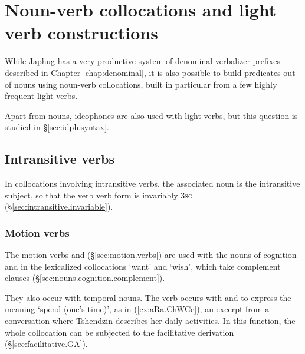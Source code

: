   
 
\section{Noun-verb collocations and light verb constructions} \label{sec:light.verb}
While Japhug has a very productive system of denominal verbalizer prefixes described in Chapter \ref{chap:denominal}, it is also possible to build predicates out of nouns using noun-verb collocations, built in particular from a few highly frequent light verbs. 

Apart from nouns, ideophones are also used with light verbs, but this question is studied in §\ref{sec:idph.syntax}.
 
\subsection{Intransitive verbs} \label{sec:intr.light.verbs}
In collocations involving intransitive verbs, the associated noun is the intransitive subject, so that the verb verb form is invariably \textsc{3sg} (§\ref{sec:intransitive.invariable}).

\subsubsection{Motion verbs} \label{sec:motion.light.verbs}
The motion verbs  and   (§\ref{sec:motion.verbs}) are used with the  nouns of cognition  and  in the lexicalized collocations  `want' and   `wish', which take complement clauses (§\ref{sec:nouns.cognition.complement}). 

They also occur with temporal nouns. The verb  occurs with  and  to express the meaning `spend (one's time)', as in (\ref{ex:aRa.ChWCe}), an excerpt from a conversation where Tshendzin describes her daily activities. In this function, the whole collocation can be subjected to the facilitative  derivation (§\ref{sec:facilitative.GA}).  


